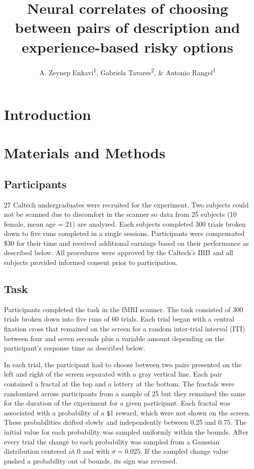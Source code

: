 \documentclass[
  english,
  man]{apa6}
\title{Neural correlates of choosing between pairs of description and experience-based risky options}
\author{A. Zeynep Enkavi\textsuperscript{1}, Gabriela Tavares\textsuperscript{2}, \& Antonio Rangel\textsuperscript{1}}
\date{}
\affiliation{\vspace{0.5cm}\textsuperscript{1} Division of Humanities and Social Sciences, California Institute of Technology\\\textsuperscript{2} Google}
\begin{document}
\maketitle

\hypertarget{introduction}{%
\section{Introduction}\label{introduction}}

\hypertarget{materials-and-methods}{%
\section{Materials and Methods}\label{materials-and-methods}}

\hypertarget{participants}{%
\subsection{Participants}\label{participants}}

27 Caltech undergraduates were recruited for the experiment. Two subjects could not be scanned due to discomfort in the scanner so data from 25 subjects (10 female, mean age = 21) are analyzed. Each subjects completed 300 trials broken down to five runs completed in a single sessions. Participants were compensated \$30 for their time and received additional earnings based on their performance as described below. All procedures were approved by the Caltech's IRB and all subjects provided informed consent prior to participation.

\hypertarget{task}{%
\subsection{Task}\label{task}}

Participants completed the task in the fMRI scanner. The task consisted of 300 trials broken down into five runs of 60 trials. Each trial began with a central fixation cross that remained on the screen for a random inter-trial interval (ITI) between four and seven seconds plus a variable amount depending on the participant's response time as described below.

In each trial, the participant had to choose between two pairs presented on the left and right of the screen separated with a gray vertical line. Each pair contained a fractal at the top and a lottery at the bottom. The fractals were randomized across participants from a sample of 25 but they remained the same for the duration of the experiment for a given participant. Each fractal was associated with a probability of a \texttt{\$}1 reward, which were not shown on the screen. These probabilities drifted slowly and independently between 0.25 and 0.75. The initial value for each probability was sampled uniformly within the bounds. After every trial the change to each probability was sampled from a Gaussian distribution centered at 0 and with \(\sigma = 0.025\). If the sampled change value pushed a probability out of bounds, its sign was reversed.
\end{document}
